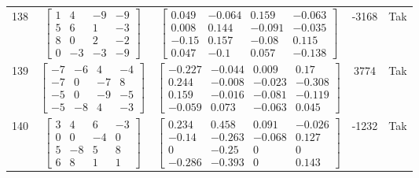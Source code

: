 \documentclass[a4paper,12pt]{article}
\begin{document}
\begin{tabular}{c c c c c}
138
&
$\begin{bmatrix} 1 & 4 & -9 & -9 \\ 5 & 6 & 1 & -3 \\ 8 & 0 & 2 & -2 \\ 0 & -3 & -3 & -9 \end{bmatrix}$
&
$\begin{bmatrix} 0.049 & -0.064 & 0.159 & -0.063 \\ 0.008 & 0.144 & -0.091 & -0.035 \\ -0.15 & 0.157 & -0.08 & 0.115 \\ 0.047 & -0.1 & 0.057 & -0.138 \end{bmatrix}$
&
-3168
&
Tak
\\
139
&
$\begin{bmatrix} -7 & -6 & 4 & -4 \\ -7 & 0 & -7 & 8 \\ -5 & 0 & -9 & -5 \\ -5 & -8 & 4 & -3 \end{bmatrix}$
&
$\begin{bmatrix} -0.227 & -0.044 & 0.009 & 0.17 \\ 0.244 & -0.008 & -0.023 & -0.308 \\ 0.159 & -0.016 & -0.081 & -0.119 \\ -0.059 & 0.073 & -0.063 & 0.045 \end{bmatrix}$
&
3774
&
Tak
\\
140
&
$\begin{bmatrix} 3 & 4 & 6 & -3 \\ 0 & 0 & -4 & 0 \\ 5 & -8 & 5 & 8 \\ 6 & 8 & 1 & 1 \end{bmatrix}$
&
$\begin{bmatrix} 0.234 & 0.458 & 0.091 & -0.026 \\ -0.14 & -0.263 & -0.068 & 0.127 \\ 0 & -0.25 & 0 & 0 \\ -0.286 & -0.393 & 0 & 0.143 \end{bmatrix}$
&
-1232
&
Tak
\\
\end{tabular} \egroup \newpage
\end{document}
